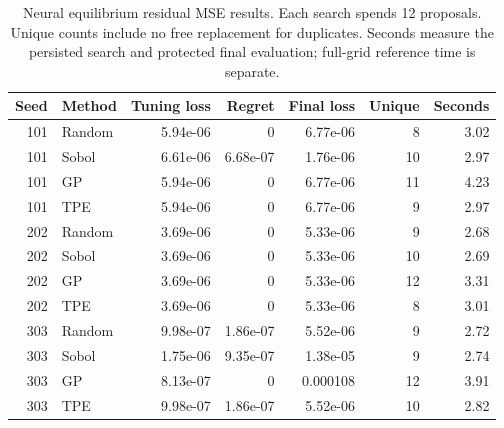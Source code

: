 \begin{table}[htbp]
\centering\small
\begin{tabular}{rlrrrrr}
\toprule
Seed & Method & Tuning loss & Regret & Final loss & Unique & Seconds \\
\midrule
101 & Random & 5.94e-06 & 0 & 6.77e-06 & 8 & 3.02 \\
101 & Sobol & 6.61e-06 & 6.68e-07 & 1.76e-06 & 10 & 2.97 \\
101 & GP & 5.94e-06 & 0 & 6.77e-06 & 11 & 4.23 \\
101 & TPE & 5.94e-06 & 0 & 6.77e-06 & 9 & 2.97 \\
202 & Random & 3.69e-06 & 0 & 5.33e-06 & 9 & 2.68 \\
202 & Sobol & 3.69e-06 & 0 & 5.33e-06 & 10 & 2.69 \\
202 & GP & 3.69e-06 & 0 & 5.33e-06 & 12 & 3.31 \\
202 & TPE & 3.69e-06 & 0 & 5.33e-06 & 8 & 3.01 \\
303 & Random & 9.98e-07 & 1.86e-07 & 5.52e-06 & 9 & 2.72 \\
303 & Sobol & 1.75e-06 & 9.35e-07 & 1.38e-05 & 9 & 2.74 \\
303 & GP & 8.13e-07 & 0 & 0.000108 & 12 & 3.91 \\
303 & TPE & 9.98e-07 & 1.86e-07 & 5.52e-06 & 10 & 2.82 \\
\bottomrule
\end{tabular}
\caption{Neural equilibrium residual MSE results. Each search spends 12 proposals. Unique counts include no free replacement for duplicates. Seconds measure the persisted search and protected final evaluation; full-grid reference time is separate.}
\end{table}
